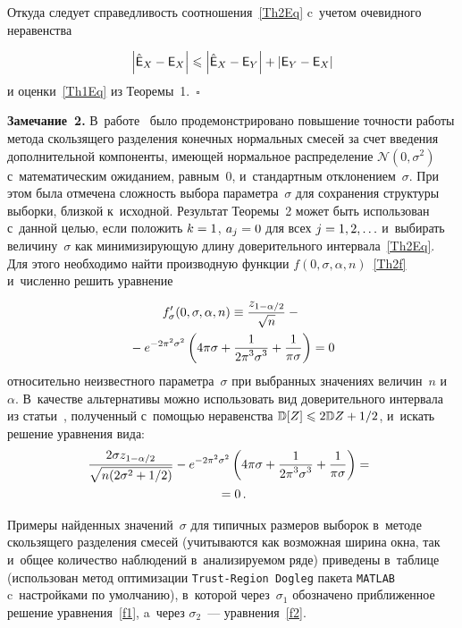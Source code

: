 \begin{multicols}{2}
\noindent
Откуда следует справедливость соотношения~\eqref{Th2Eq} c~уче\-том 
очевидного неравенства

\pagebreak

\noindent
\begin{equation*}
\left\lvert \hat{{\sf E}}_X-{\sf E}_X\right\rvert \leqslant 
\left\lvert \hat{{\sf E}}_X-{\sf E}_Y\right\rvert +\left\lvert {\sf E}_Y-{\sf E}_X\right\rvert 
\end{equation*}
и оценки~\eqref{Th1Eq} из Теоремы~1.~\hfill$\square$

\smallskip

\noindent
\textbf{Замечание~2.}
В~работе~\cite{Gorshenin2016} было продемонстрировано повышение точ\-ности 
работы метода скользящего разделения конечных нормальных смесей за счет 
введения дополнительной компоненты, имеющей нормальное 
распределение $\mathcal{N}(0,\sigma^2)$ с~математическим ожиданием, равным~$0$, 
и~стандартным отклонением~$\sigma$. При этом была отмечена сложность выбора 
параметра~$\sigma$ для сохранения структуры выборки, близкой к~исходной. 
Результат Теоремы~2 может быть использован с~данной целью, если положить $k\hm=1$, 
$a_j\hm=0$ для всех $j\hm=1,2,\ldots$ и~выбирать величину~$\sigma$ как 
минимизирующую длину доверительного интервала~\eqref{Th2Eq}. Для 
этого необходимо найти производную функции $f(0,\sigma,\alpha,n)$~\eqref{Th2f} 
и~численно решить уравнение
\begin{multline}
f_\sigma'(0,\sigma,\alpha,n)\equiv \displaystyle\frac{\displaystyle z_{1-{\alpha}/2}\mathstrut}{\displaystyle \sqrt{n}\mathstrut} - {}\\
{}-
e^{-2\pi^2\sigma^2}\left(4\pi\sigma+\displaystyle\frac{\displaystyle 1\mathstrut}{\displaystyle 2\pi^3\sigma^3\mathstrut}+
\displaystyle\frac{\displaystyle 1\mathstrut}{\displaystyle \pi\sigma\mathstrut}\right)=0
\label{f1}
\end{multline}
относительно неизвестного параметра~$\sigma$ при выбранных значениях величин~$n$ 
и~$\alpha$. В~качестве альтернативы можно использовать вид доверительного интервала 
из статьи~\cite{Ushakov2017b}, полученный с~помощью неравенства $\mathbb{D} [Z]
\hm\leqslant 2\mathbb{D} Z\hm+{1}/{2}$, и~искать решение уравнения вида:
\begin{multline}
\hspace*{-2.90578pt}\displaystyle\frac{\displaystyle 2\sigma z_{1-{\alpha}/2}\mathstrut}{\displaystyle \sqrt{n (2\sigma^2+{1}/{2})}\mathstrut} -
 e^{-2\pi^2\sigma^2}\left(4\pi\sigma+\displaystyle\frac{\displaystyle 1\mathstrut}{\displaystyle 2\pi^3\sigma^3\mathstrut}+
 \displaystyle\frac{\displaystyle 1\mathstrut}{\displaystyle \pi\sigma\mathstrut}\right)={}\\
 {}=0\,.\label{f2}
\end{multline}

Примеры найденных значений~$\sigma$ для типичных размеров выборок в~методе 
скользящего разделения смесей (учитываются как возможная ширина окна, 
так и~общее количество наблюдений в~анализируемом ряде) приведены в~таблице 
(использован метод оптимизации \verb"Trust-Region Dogleg" пакета \verb"MATLAB" 
c~настройками по умолчанию), в~которой через~$\sigma_1$ обозначено приближенное  
решение уравнения~\eqref{f1}, a~через $\sigma_2$~--- уравнения~\eqref{f2}.



\end{multicols}
